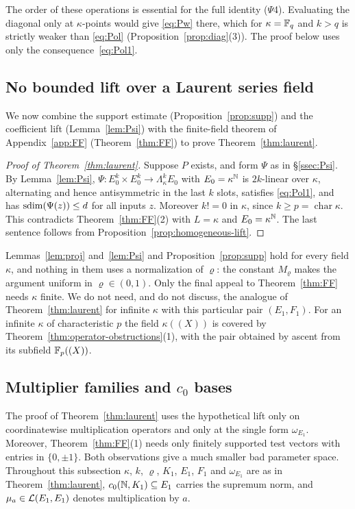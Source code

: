 The order of these operations is essential for the full identity ($\Psi$4). Evaluating the diagonal only at
$\kappa$\nobreakdash-points would give \eqref{eq:Pw} there, which for $\kappa=\mathbb F_q$ and $k>q$ is strictly weaker than
\eqref{eq:Pol} (Proposition~\ref{prop:diag}(3)). The proof below uses only the consequence~\eqref{eq:Pol1}.

\subsection{No bounded lift over a Laurent series field}

We now combine the support estimate (Proposition~\ref{prop:supp}) and the coefficient lift (Lemma~\ref{lem:Psi}) with the finite-field theorem of Appendix~\ref{app:FF} (Theorem~\ref{thm:FF}) to prove Theorem~\ref{thm:laurent}.

\begin{proof}[Proof of Theorem~\ref{thm:laurent}]
Suppose $P$ exists, and form $\Psi$ as in \S\ref{ssec:Psi}. By Lemma~\ref{lem:Psi},
$\Psi\colon E_0^k\times E_0^k\to\Lambda^k_\kappa E_0$ with $E_0=\kappa^\mathbb N$ is $2k$\nobreakdash-linear over $\kappa$, alternating and hence
antisymmetric in the last $k$ slots, satisfies \eqref{eq:Pol1}, and has $\operatorname{sdim}(\Psi(z))\le d$ for all inputs $z$. Moreover
$k!=0$ in $\kappa$, since $k\ge p=\operatorname{char}\kappa$. This contradicts Theorem~\ref{thm:FF}(2) with $L=\kappa$
and $E_0=\kappa^\mathbb N$. The last sentence follows from Proposition~\ref{prop:homogeneous-lift}.
\end{proof}

\begin{remark}\label{rem:infkappa}
Lemmas~\ref{lem:proj} and~\ref{lem:Psi} and Proposition~\ref{prop:supp} hold for every field $\kappa$, and nothing in them
uses a normalization of $\varrho$: the constant $M_\varrho$ makes the argument uniform in $\varrho\in(0,1)$. Only the final appeal to
Theorem~\ref{thm:FF} needs $\kappa$ finite. We do not need, and do not discuss, the analogue of
Theorem~\ref{thm:laurent} for infinite $\kappa$ with this particular pair $(E_1,F_1)$. For an infinite $\kappa$ of
characteristic $p$ the field $\kappa((X))$ is covered by Theorem~\ref{thm:operator-obstructions}(1), with the pair obtained by ascent from its
subfield $\mathbb F_p((X))$.
\end{remark}

\subsection{Multiplier families and \texorpdfstring{$c_0$}{c0} bases}\label{lau:ssec:multipliers}
The proof of Theorem~\ref{thm:laurent} uses the hypothetical lift only on coordinatewise multiplication operators and
only at the single form $\omega_{E_1}$. Moreover, Theorem~\ref{thm:FF}(1) needs only finitely supported test vectors with
entries in $\{0,\pm1\}$. Both observations give a much smaller bad parameter space. Throughout this subsection
$\kappa$, $k$, $\varrho$, $K_1$, $E_1$, $F_1$ and $\omega_{E_1}$ are as in Theorem~\ref{thm:laurent}, $c_0(\mathbb N,K_1)\subseteq E_1$ carries the
supremum norm, and $\mu_a\in\mathcal L(E_1,E_1)$ denotes multiplication by $a$.

